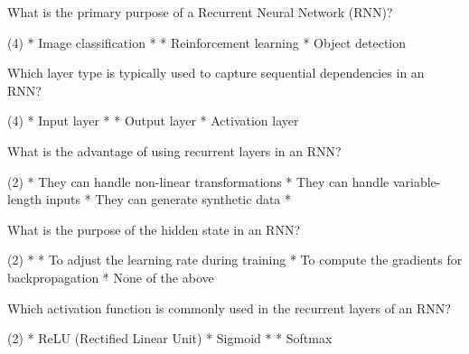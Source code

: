 \documentclass[10pt]{extarticle}
\begin{document}
\begin{exercise}
    What is the primary purpose of a Recurrent Neural Network (RNN)?
    \begin{choice} (4)
        * Image classification
        * 
        * Reinforcement learning
        * Object detection
    \end{choice}
\end{exercise}
\begin{solution}
\end{solution}

\begin{exercise}
    Which layer type is typically used to capture sequential dependencies in an RNN?
    \begin{choice} (4)
        * Input layer
        * 
        * Output layer
        * Activation layer
    \end{choice}
\end{exercise}
\begin{solution}
\end{solution}

\begin{exercise}
    What is the advantage of using recurrent layers in an RNN?
    \begin{choice} (2)
        * They can handle non-linear transformations
        * They can handle variable-length inputs
        * They can generate synthetic data
        * 
    \end{choice}
\end{exercise}
\begin{solution}
\end{solution}

\begin{exercise}
    What is the purpose of the hidden state in an RNN?
    \begin{choice} (2)
        * 
        * To adjust the learning rate during training
        * To compute the gradients for backpropagation
        * None of the above
    \end{choice}
\end{exercise}
\begin{solution}
\end{solution}

\begin{exercise}
    Which activation function is commonly used in the recurrent layers of an RNN?
    \begin{choice} (2)
        * ReLU (Rectified Linear Unit)
        * Sigmoid
        * 
        * Softmax
    \end{choice}
\end{exercise}
\begin{solution}
\end{solution}
\end{document}

